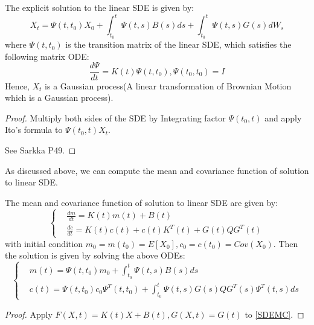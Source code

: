 \begin{theorem}
    The explicit solution to the linear SDE is given by:
    \begin{equation}\label{explicitsolLSDE}
        X_t = \Psi(t, t_0)X_0 + \int_{t_0}^t \Psi(t, s)B(s)ds + \int_{t_0}^t \Psi(t, s)G(s)dW_s
    \end{equation}
    where $\Psi(t, t_0)$ is the transition matrix of the linear SDE, which satisfies the following matrix ODE:
    \begin{equation}
        \frac{d\Psi}{dt} = K(t)\Psi(t, t_0), \Psi(t_0, t_0) = I
    \end{equation}
    Hence, $X_t$ is a Gaussian process(A linear transformation of Brownian Motion which is a Gaussian process).
\end{theorem}
\begin{proof}
    Multiply both sides of the SDE by Integrating factor $\Psi(t_0, t)$ and apply Ito's formula to $\Psi(t_0, t)X_t$.

    See Sarkka P49.
\end{proof}
As discussed above, we can compute the mean and covariance function of solution to linear SDE. 
\begin{theorem}
    The mean and covariance function of solution to linear SDE are given by:
    \begin{equation}
        \left\{
            \begin{aligned}
                &\frac{d m}{d t} = K(t)m(t) + B(t)\\
                &\frac{d c}{d t} = K(t)c(t) + c(t)K^T(t)+ G(t)QG^T(t)
            \end{aligned}
        \right.
    \end{equation}
    with initial condition $m_0 =m(t_0)=E[X_0], c_0 =c(t_0)=Cov(X_0)$. Then the solution is given by solving the above ODEs:
    \begin{equation}\label{LSDEMC}
        \left\{
            \begin{aligned}
                &m(t) = \Psi(t, t_0)m_0 + \int_{t_0}^t \Psi(t, s)B(s)ds\\
                &c(t) = \Psi(t, t_0)c_0\Psi^T(t, t_0) + \int_{t_0}^t \Psi(t, s)G(s)QG^T(s)\Psi^T(t, s)ds
            \end{aligned}
        \right.
    \end{equation}

\end{theorem}
\begin{proof}
    Apply $F(X, t)=K(t)X + B(t), G(X, t)=G(t)$ to \ref{SDEMC}.
\end{proof}

